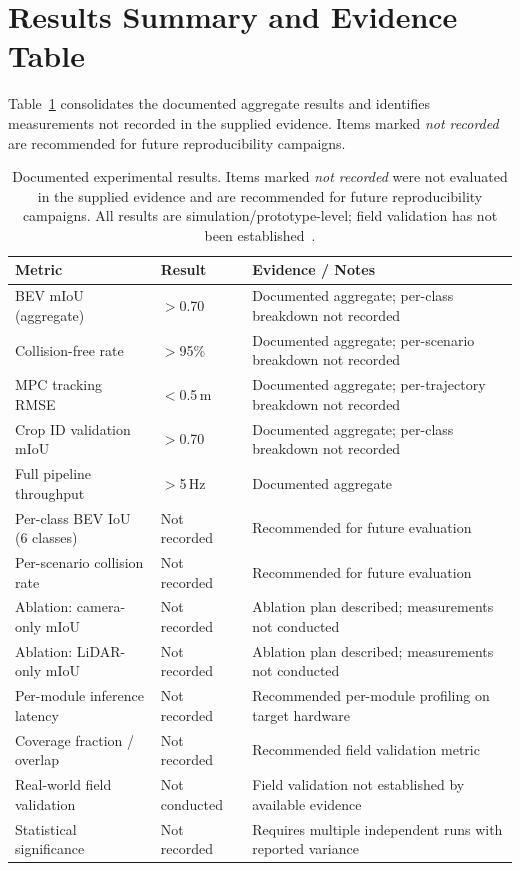 \documentclass[12pt, a4paper]{article}
\begin{document}
\section{Results Summary and Evidence Table}

Table~\ref{tab:results} consolidates the documented aggregate results and identifies
measurements not recorded in the supplied evidence. Items marked \emph{not recorded} are
recommended for future reproducibility campaigns.

\begin{table}[htbp]
\centering
\caption{Documented experimental results. Items marked \emph{not recorded} were not evaluated in the supplied evidence and are recommended for future reproducibility campaigns. All results are simulation/prototype-level; field validation has not been established~\cite{ref233, ref234}.}
\label{tab:results}
\begin{tabularx}{\textwidth}{X l X}
\toprule
\textbf{Metric} & \textbf{Result} & \textbf{Evidence / Notes} \\
\midrule
BEV mIoU (aggregate) & $>$0.70 & Documented aggregate; per-class breakdown not recorded \\
\addlinespace
Collision-free rate & $>$95\% & Documented aggregate; per-scenario breakdown not recorded \\
\addlinespace
MPC tracking RMSE & $<$0.5\,m & Documented aggregate; per-trajectory breakdown not recorded \\
\addlinespace
Crop ID validation mIoU & $>$0.70 & Documented aggregate; per-class breakdown not recorded \\
\addlinespace
Full pipeline throughput & $>$5\,Hz & Documented aggregate \\
\addlinespace
Per-class BEV IoU (6 classes) & Not recorded & Recommended for future evaluation \\
\addlinespace
Per-scenario collision rate & Not recorded & Recommended for future evaluation \\
\addlinespace
Ablation: camera-only mIoU & Not recorded & Ablation plan described; measurements not conducted \\
\addlinespace
Ablation: LiDAR-only mIoU & Not recorded & Ablation plan described; measurements not conducted \\
\addlinespace
Per-module inference latency & Not recorded & Recommended per-module profiling on target hardware \\
\addlinespace
Coverage fraction / overlap & Not recorded & Recommended field validation metric \\
\addlinespace
Real-world field validation & Not conducted & Field validation not established by available evidence \\
\addlinespace
Statistical significance & Not recorded & Requires multiple independent runs with reported variance \\
\bottomrule
\end{tabularx}
\end{table}
\end{document}
